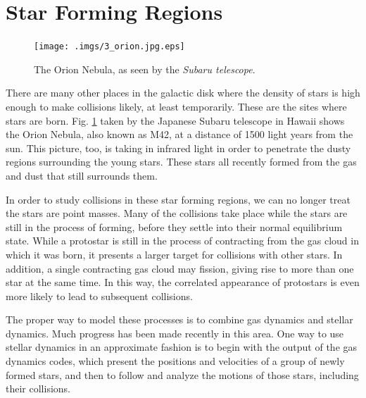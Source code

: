 \documentclass{book}
\begin{document}
\section{  Star Forming Regions}
\label{sect:8}


 
\begin{figure}
\begin{minipage}{\columnwidth}
\begin{center}
\renewcommand{\thefootnote}{\fnsymbol{footnote}}
    \texttt{[image: .imgs/3\_orion.jpg.eps]}
\caption{The Orion Nebula, as seen by the
 {\it Subaru telescope\protect \footnotemark[1]}.
}

\label{orion}
\end{center}
\end{minipage}
\end{figure}



There are many other places in the galactic disk where the density of
stars is high enough to make collisions likely, at least temporarily.
These are the sites where stars are born.  Fig. \ref{orion} taken by
the Japanese Subaru telescope in Hawaii shows the Orion Nebula, also
known as M42, at a distance of 1500 light years from the sun.  This
picture, too, is taking in infrared light in order to penetrate the
dusty regions surrounding the young stars.  These stars all recently
formed from the gas and dust that still surrounds them.

In order to study collisions in these star forming regions, we can no
longer treat the stars are point masses.  Many of the collisions take
place while the stars are still in the process of forming, before they
settle into their normal equilibrium state.  While a protostar is
still in the process of contracting from the gas cloud in which it was
born, it presents a larger target for collisions with other stars.  In
addition, a single contracting gas cloud may fission, giving rise to
more than one star at the same time.  In this way, the correlated
appearance of protostars is even more likely to lead to subsequent
collisions.

The proper way to model these processes is to combine gas dynamics and
stellar dynamics.  Much progress has been made recently in this area.
One way to use stellar dynamics in an approximate fashion is to begin
with the output of the gas dynamics codes, which present the positions
and velocities of a group of newly formed stars, and then to follow
and analyze the motions of those stars, including their collisions.
\end{document}
